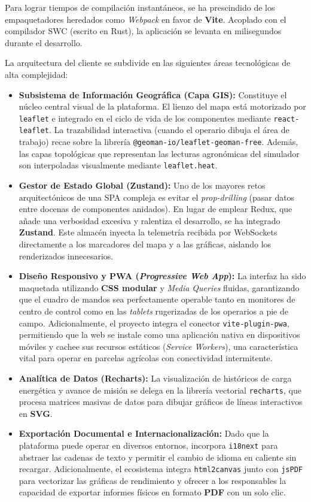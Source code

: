 Para lograr tiempos de compilación instantáneos, se ha prescindido de los empaquetadores heredados como \textit{Webpack} en favor de \textbf{Vite}. Acoplado con el compilador SWC (escrito en Rust), la aplicación se levanta en milisegundos durante el desarrollo.

La arquitectura del cliente se subdivide en las siguientes áreas tecnológicas de alta complejidad:
\begin{itemize}
    \item \textbf{Subsistema de Información Geográfica (Capa GIS):} Constituye el núcleo central visual de la plataforma. El lienzo del mapa está motorizado por \texttt{leaflet} e integrado en el ciclo de vida de los componentes mediante \texttt{react-leaflet}. La trazabilidad interactiva (cuando el operario dibuja el área de trabajo) recae sobre la librería \texttt{@geoman-io/leaflet-geoman-free}. Además, las capas topológicas que representan las lecturas agronómicas del simulador son interpoladas visualmente mediante \texttt{leaflet.heat}.
    \item \textbf{Gestor de Estado Global (Zustand):} Uno de los mayores retos arquitectónicos de una SPA compleja es evitar el \textit{prop-drilling} (pasar datos entre docenas de componentes anidados). En lugar de emplear Redux, que añade una verbosidad excesiva y ralentiza el desarrollo, se ha integrado \textbf{Zustand}. Este almacén inyecta la telemetría recibida por WebSockets directamente a los marcadores del mapa y a las gráficas, aislando los renderizados innecesarios.
    \item \textbf{Diseño Responsivo y PWA (\textit{Progressive Web App}):} La interfaz ha sido maquetada utilizando \textbf{CSS modular} y \textit{Media Queries} fluidas, garantizando que el cuadro de mandos sea perfectamente operable tanto en monitores de centro de control como en las \textit{tablets} rugerizadas de los operarios a pie de campo. Adicionalmente, el proyecto integra el conector \texttt{vite-plugin-pwa}, permitiendo que la web se instale como una aplicación nativa en dispositivos móviles y cachee sus recursos estáticos (\textit{Service Workers}), una característica vital para operar en parcelas agrícolas con conectividad intermitente.
    \item \textbf{Analítica de Datos (Recharts):} La visualización de históricos de carga energética y avance de misión se delega en la librería vectorial \texttt{recharts}, que procesa matrices masivas de datos para dibujar gráficos de líneas interactivos en \textbf{SVG}.
    \item \textbf{Exportación Documental e Internacionalización:} Dado que la plataforma puede operar en diversos entornos, incorpora \texttt{i18next} para abstraer las cadenas de texto y permitir el cambio de idioma en caliente sin recargar. Adicionalmente, el ecosistema integra \texttt{html2canvas} junto con \texttt{jsPDF} para vectorizar las gráficas de rendimiento y ofrecer a los responsables la capacidad de exportar informes físicos en formato \textbf{PDF} con un solo clic.
\end{itemize}

